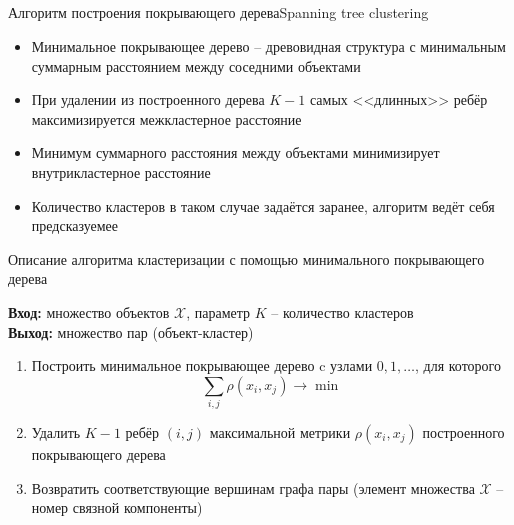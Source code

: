 \documentclass[compress,unicode]{beamer}
\begin{document}
\subsection{}
\begin{frame}{Алгоритм построения покрывающего дерева}{Spanning tree clustering}
\begin{itemize}
	\item Минимальное покрывающее дерево -- древовидная структура с минимальным суммарным расстоянием между соседними объектами
	\item При удалении из построенного дерева $K-1$ самых <<длинных>> ребёр максимизируется межкластерное расстояние
	\item Минимум суммарного расстояния между объектами минимизирует внутрикластерное расстояние
	\item Количество кластеров в таком случае задаётся заранее, алгоритм ведёт себя предсказуемее
\end{itemize}
\end{frame}

\begin{frame}{Описание алгоритма кластеризации с помощью минимального покрывающего дерева}{}
\begin{block}{}
\small
{\bf\color{main}Вход:} множество объектов $\mathcal{X}$, параметр $K$ -- количество кластеров\\
{\bf\color{main}Выход:} множество пар (объект-кластер) \\
\begin{enumerate}
\item Построить минимальное покрывающее дерево c узлами $0,1,\dots$, для которого 
$$
\sum_{i,j} \rho (x_i,x_j) \to \min 
$$
\item Удалить $K-1$ ребёр $(i,j)$ максимальной метрики $\rho(x_i,x_j)$ построенного покрывающего дерева
\item Возвратить соответствующие вершинам графа пары (элемент множества $\mathcal{X}$ -- номер связной компоненты)

\end{enumerate}
\end{block}\end{frame}
\end{document}
